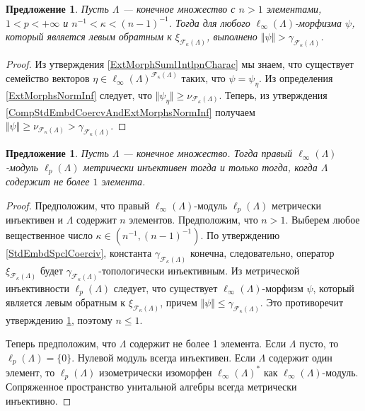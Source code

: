 \documentclass[12pt]{article}
\newtheorem{proposition}[theorem]{Предложение}
\begin{document}
\begin{proposition}\label{RetrPrblmNoSln}
    Пусть $\Lambda$ --- конечное множество с $n>1$ элементами, $1<p<+\infty$ 
    и $n^{-1}<\kappa<(n-1)^{-1}$. Тогда для 
    любого $\ell_\infty(\Lambda)$-морфизма $\psi$, который является левым 
    обратным к $\xi_{\mathcal{F}_{\kappa}(\Lambda)}$, 
    выполнено $\Vert \psi\Vert>\gamma_{\mathcal{F}_{\kappa}(\Lambda)}$.  
\end{proposition}
\begin{proof}
    Из утверждения \ref{ExtMorphSuml1ntlpnCharac} мы знаем, что существует 
    семейство 
    векторов $\eta\in\ell_\infty(\Lambda)^{\mathcal{F}_{\kappa}(\Lambda)}$ 
    таких, что  $\psi=\psi_{\eta}$. Из определения \ref{ExtMorphsNormInf} 
    следует, 
    что $\Vert \psi_{\eta}\Vert\geq \nu_{\mathcal{F}_{\kappa}(\Lambda)}$. 
    Теперь, из утверждения \ref{CompStdEmbdCoercvAndExtMorphsNormInf} получаем 
    $\Vert\psi\Vert\geq\nu_{\mathcal{F}_{\kappa}(\Lambda)} > 
    \gamma_{\mathcal{F}_{\kappa}(\Lambda)}$.
\end{proof}

\begin{proposition}\label{linftnModlpnIsntMetInjCharac}
    Пусть $\Lambda$ --- конечное множество. Тогда 
    правый $\ell_\infty(\Lambda)$-модуль $\ell_p(\Lambda)$ метрически 
    инъективен тогда и только тогда, когда $\Lambda$ содержит не 
    более $1$ элемента.
\end{proposition}
\begin{proof}
    Предположим, что правый $\ell_\infty(\Lambda)$-модуль $\ell_p(\Lambda)$ 
    метрически инъективен и $\Lambda$ содержит $n$ элементов. Предположим, 
    что $n>1$. Выберем любое вещественное число $\kappa\in(n^{-1},(n-1)^{-1})$. 
    По утверждению \ref{StdEmbdSpclCoerciv}, 
    константа $\gamma_{\mathcal{F}_{\kappa}(\Lambda)}$ конечна, 
    следовательно, оператор $\xi_{\mathcal{F}_{\kappa}(\Lambda)}$
    будет $\gamma_{\mathcal{F}_{\kappa}(\Lambda)}$-топологически инъективным. 
    Из метрической инъективности $\ell_p(\Lambda)$ следует, что существует 
    $\ell_\infty(\Lambda)$-морфизм $\psi$, который является левым обратным к 
    $\xi_{\mathcal{F}_{\kappa}(\Lambda)}$, 
    причем $\Vert\psi\Vert\leq\gamma_{\mathcal{F}_{\kappa}(\Lambda)}$. Это 
    противоречит утверждению \ref{linftnModlpnIsntMetInjCharac}, 
    поэтому $n\leq 1$.

    Теперь предположим, что $\Lambda$ содержит не более 1 элемента. 
    Если $\Lambda$ пусто, то $\ell_p(\Lambda)=\{0\}$. Нулевой модуль всегда 
    инъективен. Если $\Lambda$ содержит один элемент, то $\ell_p(\Lambda)$ 
    изометрически изоморфен $\ell_\infty(\Lambda)^*$ 
    как $\ell_\infty(\Lambda)$-модуль. Сопряженное пространство унитальной 
    алгебры всегда метрически инъективно.
\end{proof}
\end{document}
